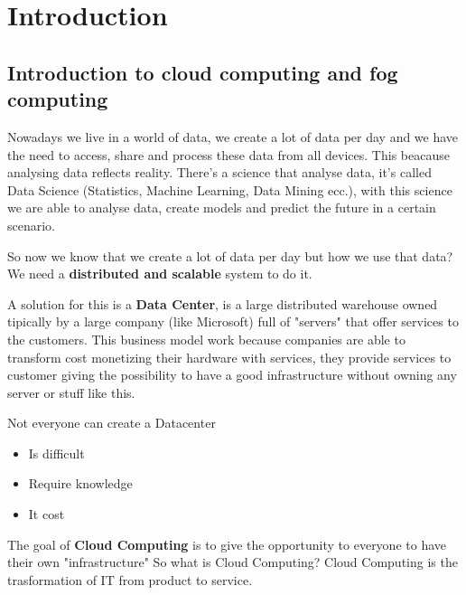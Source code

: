 \section{Introduction}
\subsection{Introduction to cloud computing and fog computing}
Nowadays we live in a world of data, we create a lot of data per day and we have the need to access, share and process these data from all devices. This beacause analysing data reflects reality. There's a science that analyse data, it's called Data Science (Statistics, Machine Learning, Data Mining ecc.), with this science we are able to analyse data, create models and predict the future in a certain scenario. 

So now we know that we create a lot of data per day but how we use that data? We need a \textbf{distributed and scalable} system to do it. 

A solution for this is a \textbf{Data Center}, is a large distributed warehouse owned tipically by a large company (like Microsoft) full of "servers" that offer services to the customers. This business model work because companies are able to transform cost monetizing their hardware with services, they provide services to customer giving the possibility to have a good infrastructure without owning any server or stuff like this.

Not everyone can create a Datacenter
\begin{itemize}
    \item Is difficult
    \item Require knowledge 
    \item It cost 
\end{itemize}

The goal of \textbf{Cloud Computing} is to give the opportunity to everyone to have their own "infrastructure" 
So what is Cloud Computing? Cloud Computing is the trasformation of IT from product to service.

